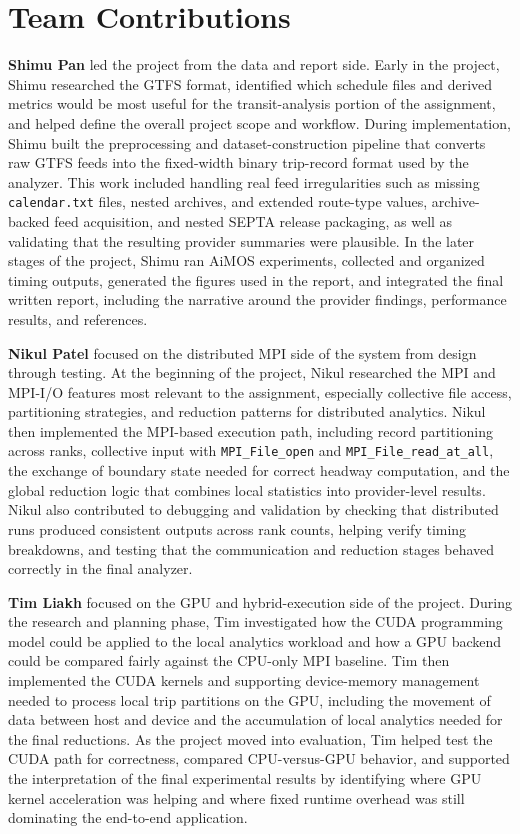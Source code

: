 \documentclass[sigconf,nonacm]{acmart}
\begin{document}
\section{Team Contributions}
\textbf{Shimu Pan} led the project from the data and report side.
Early in the project, Shimu researched the GTFS format,
identified which schedule files and derived metrics would be
most useful for the transit-analysis portion of the assignment,
and helped define the overall project scope and workflow.
During implementation, Shimu built the preprocessing and
dataset-construction pipeline that converts raw GTFS feeds
into the fixed-width binary trip-record format used by the
analyzer. This work included handling real feed irregularities
such as missing \texttt{calendar.txt} files, nested archives, and
extended route-type values, archive-backed feed acquisition, and nested SEPTA release packaging, as well as validating that the resulting provider summaries were plausible. In the later stages
of the project, Shimu ran AiMOS experiments, collected and
organized timing outputs, generated the figures used in the
report, and integrated the final written report, including the
narrative around the provider findings, performance results,
and references.

\textbf{Nikul Patel} focused on the distributed MPI side of the
system from design through testing. At the beginning of the
project, Nikul researched the MPI and MPI-I/O features most
relevant to the assignment, especially collective file access,
partitioning strategies, and reduction patterns for distributed
analytics. Nikul then implemented the MPI-based execution
path, including record partitioning across ranks, collective
input with \texttt{MPI\_File\_open} and \texttt{MPI\_File\_read\_at\_all}, the
exchange of boundary state needed for correct headway computation, and the global reduction logic that combines local
statistics into provider-level results. Nikul also contributed to
debugging and validation by checking that distributed runs
produced consistent outputs across rank counts, helping verify timing breakdowns, and testing that the communication
and reduction stages behaved correctly in the final analyzer.

\textbf{Tim Liakh} focused on the GPU and hybrid-execution
side of the project. During the research and planning phase,
Tim investigated how the CUDA programming model could
be applied to the local analytics workload and how a GPU
backend could be compared fairly against the CPU-only
MPI baseline. Tim then implemented the CUDA kernels and
supporting device-memory management needed to process
local trip partitions on the GPU, including the movement
of data between host and device and the accumulation of
local analytics needed for the final reductions. As the project
moved into evaluation, Tim helped test the CUDA path
for correctness, compared CPU-versus-GPU behavior, and
supported the interpretation of the final experimental results
by identifying where GPU kernel acceleration was helping
and where fixed runtime overhead was still dominating the
end-to-end application.
\end{document}
